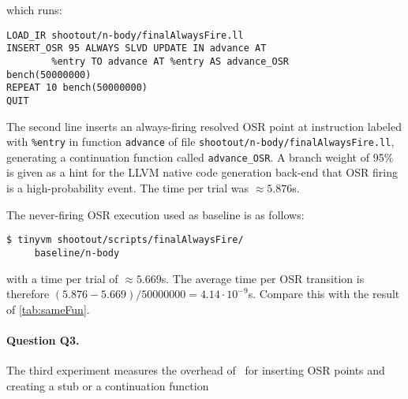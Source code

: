 \noindent which runs:

\begin{small}
\begin{verbatim}
LOAD_IR shootout/n-body/finalAlwaysFire.ll
INSERT_OSR 95 ALWAYS SLVD UPDATE IN advance AT 
        %entry TO advance AT %entry AS advance_OSR
bench(50000000)
REPEAT 10 bench(50000000)
QUIT
\end{verbatim}
\end{small}

\noindent The second line inserts an always-firing resolved OSR point at instruction labeled with {\tt \%entry} in function {\tt advance} of file {\tt shootout/n-body/finalAlwaysFire.ll}, generating a continuation function called {\tt advance\_OSR}. A branch weight of 95\% is given as a hint for the LLVM native code generation back-end that OSR firing is a high-probability event. The time per trial was $\approx5.876$s.

The never-firing OSR execution used as baseline is as follows:
\begin{small}
\begin{verbatim}
$ tinyvm shootout/scripts/finalAlwaysFire/
     baseline/n-body
\end{verbatim}
\end{small}

\noindent with a time per trial of $\approx5.669$s. The average time per OSR transition is therefore $(5.876-5.669)/50000000=4.14\cdot 10^{-9}$s. Compare this with the result of \ref{tab:sameFun}.

\paragraph{Question Q3.} The third experiment measures the overhead of \osrkit\ for inserting OSR points and creating a stub or a continuation function



